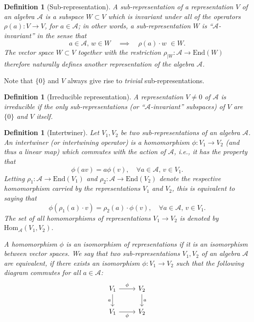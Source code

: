 \documentclass[12pt]{article}
\theoremstyle{plain}
\newtheorem{definition}[theorem]{Definition}
\begin{document}
\begin{definition}[Sub-representation]
A sub-representation of a representation $V$ of an algebra $\mathcal{A}$ is a subspace $W \subset V$ which is invariant under all of the operators $\rho(a): V \rightarrow V$, for $a \in \mathcal{A}$; in other words, a sub-representation $W$ is ``$\mathcal{A}$-invariant'' in the sense that
$$
a \in \mathcal{A}, \, w \in W \quad \implies \quad \rho(a) \cdot w \,\,\in W.
$$
The vector space $W \subset V$ together with the restriction $\rho_{|W}: \mathcal{A} \rightarrow \mathrm{End}(W)$ therefore naturally defines another representation of  the algebra $\mathcal{A}$.
\end{definition}

Note that $\{0\}$ and $V$ always give rise to \emph{trivial} sub-representations.

\begin{definition}[Irreducible representation]
A representation $V \neq 0$ of $\mathcal{A}$ is \emph{irreducible} if the only sub-representations (or ``$\mathcal{A}$-invariant'' subspaces) of $V$ are $\{0\}$ and $V$ itself.
\end{definition}

\begin{definition}[Intertwiner]\label{def:intertwiner}
Let $V_1,V_2$ be two sub-representations of an algebra $\mathcal{A}$. An \emph{intertwiner} (or intertwining operator) is a homomorphism $\phi: V_1 \rightarrow V_2$ (and thus a linear map) which commutes with the action of $\mathcal{A}$, i.e., it has the property that
$$
\phi(a v) = a\phi(v), \quad \forall a \in \mathcal{A}, \, v \in V_1.
$$
Letting $\rho_1: \mathcal{A} \rightarrow \mathrm{End}(V_1)$ and $\rho_2: \mathcal{A} \rightarrow \mathrm{End}(V_2)$ denote the respective homomorphism carried by the representations $V_1$ and $V_2$, this is equivalent to saying that
$$
\phi(\rho_1(a)\cdot v) = \rho_2(a) \cdot \phi(v), \quad \forall a \in \mathcal{A}, \, v \in V_1.
$$The set of all homomorphisms of representations $V_1 \rightarrow V_2$ is denoted by $\mathrm{Hom}_{\mathcal{A}}(V_1, V_2)$.

A homomorphism $\phi$ is an isomorphism of representations if it is an isomorphism between vector spaces. We say that two sub-representations $V_1,V_2$ of an algebra $\mathcal{A}$ are equivalent, if there exists an isomorphism $\phi: V_1 \rightarrow V_2$ such that the following diagram commutes for all $a \in \mathcal{A}$:
\[
\begin{tikzcd}
V_1 \arrow[r, "\phi"] \arrow[d, "a"'] & V_2 \arrow[d, "a"] \\
V_1 \arrow[r, "\phi"'] & V_2
\end{tikzcd}
\]
\end{definition}
\end{document}
